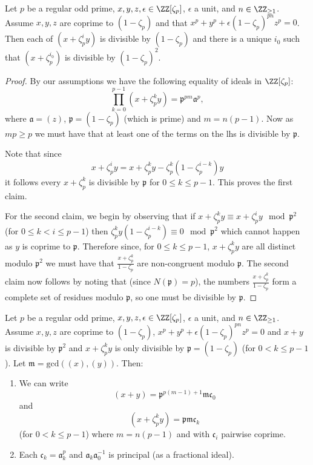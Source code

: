 \begin{lemma}\label{lem:gen_dvd_by_frak_p}
		Let $p$ be a regular odd prime, $x,y,z,\epsilon \in \ZZ[\zeta_p]$, $\epsilon$ a unit, and $n \in \ZZ_{\geq 1}$. Assume $x,y,z$ are coprime to $(1-\zeta_p)$ and that $x^p+y^p+\epsilon(1-\zeta_p)^{pn}z^p=0$. Then each of $(x+\zeta_p^i y)$ is divisible by $(1-\zeta_p)$ and there is a unique $i_0$ such that $(x+\zeta_p^{i_0})$ is divisible by $(1-\zeta_p)^2$.
\end{lemma}
\begin{proof}
	By our assumptions we have the following equality of ideals in  $\ZZ[\zeta_p]$: \[ \prod_{k=0}^{p-1} (x+\zeta_p^ky) = \mathfrak{p}^{pm}\mathfrak{a}^p,  \] where $\mathfrak{a}=(z)$, $\mathfrak{p}=(1-\zeta_p)$ (which is prime) and $m=n(p-1)$. Now as $mp \geq p$ we must have that at least one of the terms on the lhs is divisible by $\mathfrak{p}$.

	Note that since \[x+\zeta_p^iy= x+\zeta_p^ky - \zeta_p^k(1-\zeta_p^{i-k})y\] it follows every  $x+\zeta_p^k$ is divisible by $\mathfrak{p}$ for $0 \le k \le p-1$. This proves the first claim.

	For the second claim, we begin by observing that if $x+\zeta_p^ky \equiv x + \zeta_p^i y \mod \mathfrak{p}^2$ (for $0 \leq k < i \leq p-1$) then $\zeta_p^ky(1-\zeta_p^{i-k}) \equiv 0 \mod \mathfrak{p}^2$ which cannot happen as $y$ is coprime to $\mathfrak{p}$. Therefore since, for $0 \leq k \leq p-1$, $x+\zeta_p^ky$ are all distinct modulo $\mathfrak{p}^2$ we must have that $\frac{x+\zeta_p^k}{1-\zeta_p}$ are non-congruent modulo $\mathfrak{p}$. The second claim now follows by noting that (since $N(\mathfrak{p})=p$), the numbers $\frac{x+\zeta_p^k}{1-\zeta_p}$ form a complete set of residues modulo $\mathfrak{p}$, so one must be divisible by $\mathfrak{p}$.
\end{proof}

\begin{lemma}\label{lem:gen_ideal_coprimality}
		Let $p$ be a regular odd prime, $x,y,z,\epsilon \in \ZZ[\zeta_p]$, $\epsilon$ a unit, and $n \in \ZZ_{\geq 1}$. Assume $x,y,z$ are coprime to $(1-\zeta_p)$,  $x^p+y^p+\epsilon(1-\zeta_p)^{pn}z^p=0$ and $x+y$ is divisible by $\mathfrak{p}^2$ and $x+ \zeta_p^ky$ is only divisible by $\mathfrak{p}=(1-\zeta_p)$ (for $0 < k \leq p-1$).
		Let $\mathfrak{m}= \mathrm{gcd}((x),(y))$. Then:
		\begin{enumerate}
			\item We can write 	\[(x+y)=\mathfrak{p}^{p(m-1)+1}\mathfrak{m}\mathfrak{c}_0\] and \[ (x+\zeta_p^k y)=\mathfrak{p}\mathfrak{m}\mathfrak{c}_k \] (for $0 < k \leq p-1$) where $m=n(p-1)$ and with $\mathfrak{c}_i$ pairwise coprime.
			\item Each $\mathfrak{c}_k=\mathfrak{a}_k^p$ and $\mathfrak{a}_k\mathfrak{a}_0^{-1}$ is principal (as a fractional ideal).
		\end{enumerate}
		\leanok
\end{lemma}


